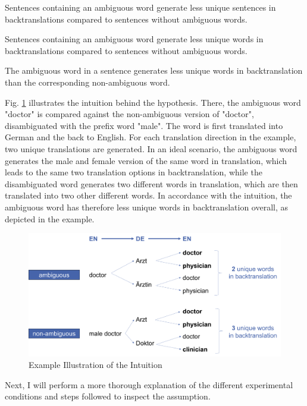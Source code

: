 \setcounter{subhyp}{0}


\begin{subhyp}\label{a}
Sentences containing an ambiguous word generate less unique sentences in backtranslations compared to sentences without ambiguous words.
\end{subhyp}

\begin{subhyp}\label{b}
Sentences containing an ambiguous word generate less unique words in backtranslations compared to sentences without ambiguous words.
\end{subhyp}

\begin{subhyp}\label{c}
The ambiguous word in a sentence generates less unique words in backtranslation than the corresponding non-ambiguous word.
\end{subhyp}



Fig. \ref{fig:intuition} illustrates the intuition behind the hypothesis. There, the ambiguous word "doctor" is compared against the non-ambiguous version of "doctor", disambiguated with the prefix word "male". The word is first translated into German and the back to English. For each translation direction in the example, two unique translations are generated. In an ideal scenario, the ambiguous word generates the male and female version of the same word in translation, which leads to the same two translation options in backtranslation, while the disambiguated word generates two different words in translation, which are then translated into two other different words. In accordance with the intuition, the ambiguous word has therefore less unique words in backtranslation overall, as depicted in the example.

\begin{figure}
  \centering
  \includegraphics[scale=0.45]{figures/intuition.png}
  \caption{Example Illustration of the Intuition}
  \label{fig:intuition}
\end{figure}

Next, I will perform a more thorough explanation of the different experimental conditions and steps followed to inspect the assumption.



